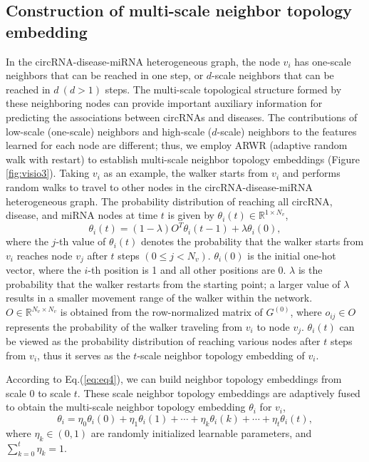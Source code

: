 \documentclass[journal=jcisd8,manuscript=article]{achemso}
\begin{document}
\subsection{Construction of multi-scale neighbor topology embedding}
\vspace{-0.3cm}
In the circRNA-disease-miRNA heterogeneous graph, the node $v_i$ has one-scale neighbors that can be reached in one step, or $d$-scale neighbors that can be reached in $d\ (d > 1)$ steps. The multi-scale topological structure formed by these neighboring nodes can provide important auxiliary information for predicting the associations between circRNAs and diseases. The contributions of low-scale (one-scale) neighbors and high-scale ($d$-scale) neighbors to the features learned for each node are different; thus, we employ ARWR (adaptive random walk with restart) to establish multi-scale neighbor topology embeddings (Figure \ref{fig:visio3}). Taking $v_i$ as an example, the walker starts from $v_i$ and performs random walks to travel to other nodes in the circRNA-disease-miRNA heterogeneous graph. The probability distribution of reaching all circRNA, disease, and miRNA nodes at time $t$ is given by $\theta _i{(t)} \in \mathbb{R}^{1 \times N_v}$,
\begin{equation}
\theta _i{(t)} = (1 - \lambda) O^T \theta _i{(t-1)} + \lambda \theta _i{(0)},
\label{eq:eq4}
\end{equation}
where the $j$-th value of $\theta _i{(t)}$ denotes the probability that the walker starts from $v_i$ reaches node $v_j$ after $t$ steps $(0 \leqslant j < N_v)$. $\theta _i{(0)}$ is the initial one-hot vector, where the $i$-th position is 1 and all other positions are 0. $\lambda$ is the probability that the walker restarts from the starting point; a larger value of $\lambda$ results in a smaller movement range of the walker within the network. $O \in \mathbb{R}^{N_v \times N_v}$ is obtained from the row-normalized matrix of $G^{(0)}$, where $o_{ij} \in O$ represents the probability of the walker traveling from $v_i$ to node $v_j$. $\theta _i{(t)}$ can be viewed as the probability distribution of reaching various nodes after $t$ steps from $v_i$, thus it serves as the $t$-scale neighbor topology embedding of $v_i$.

According to Eq.(\ref{eq:eq4}), we can build neighbor topology embeddings from scale 0 to scale $t$. These scale neighbor topology embeddings are adaptively fused to obtain the multi-scale neighbor topology embedding $\theta _i$ for $v_i$,
\begin{equation}
\theta _i = \eta_0  \theta _i{(0)} + \eta_1 \theta _i{(1)} + \cdots + \eta_k \theta _i{(k)} + \cdots + \eta_t \theta _i{(t)},
\end{equation}
where $\eta_k \in (0, 1)$ are randomly initialized learnable parameters, and $\sum_{k=0}^{t}\eta_k = 1$.
\end{document}
